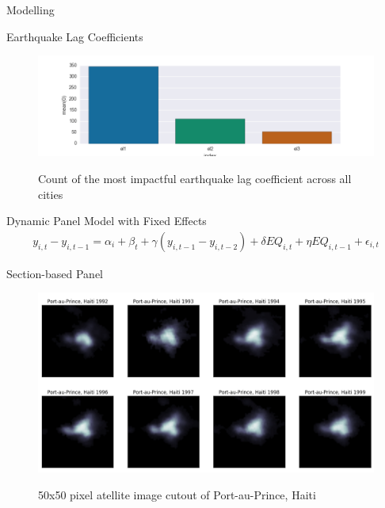 \documentclass{beamer}
\begin{document}
\begin{section}{Modelling}
  \begin{frame}{Earthquake Lag Coefficients}
    \begin{figure}
      \centering
      \includegraphics[width=\linewidth]{non_balanced_earthquake_coefficients_winning_lag}\label{fig:non_balanced_earthquake_winning_lag}
      \caption{Count of the most impactful earthquake lag coefficient across all cities}
    \end{figure}
  \end{frame}

  \begin{frame}{Dynamic Panel Model with Fixed Effects}
    \begin{align*}
      y_{i,t}-y_{i,t-1}=\alpha_i+\beta_t+\gamma(y_{i,t-1}-y_{i,t-2})+\delta EQ_{i,t}+\eta EQ_{i,t-1}+\epsilon_{i,t}
    \end{align*}      
  \end{frame}

  \begin{frame}{Section-based Panel}
    \begin{figure}
      \centering
      \includegraphics[width=\linewidth]{haiti_luminosity_series_short}\label{fig:haiti_luminosity_series_short}
      \caption{50x50 pixel atellite image cutout of Port-au-Prince, Haiti}
    \end{figure}
  \end{frame}
\end{section}
\end{document}
